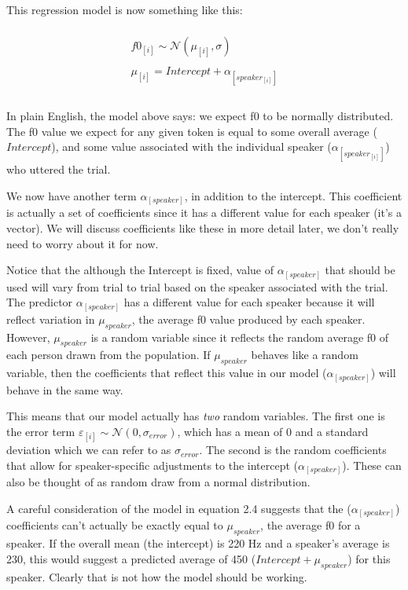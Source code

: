 \documentclass[
]{book}
\begin{document}
This regression model is now something like this:

\begin{equation}
\begin{split}
\\
f0_{[i]} \sim \mathcal{N}(\mu_{[i]},\sigma) \\ \\
\mu_{[i]} = Intercept + \alpha_{[speaker_{[i]}]} \\
\\
\end{split}
\label{eq:26}
\end{equation}

In plain English, the model above says: we expect f0 to be normally distributed. The f0 value we expect for any given token is equal to some overall average (\(Intercept\)), and some value associated with the individual speaker (\(\alpha_{[speaker_{[i]}]}\)) who uttered the trial.

We now have another term \(\alpha_{[speaker]}\), in addition to the intercept. This coefficient is actually a set of coefficients since it has a different value for each speaker (it's a vector). We will discuss coefficients like these in more detail later, we don't really need to worry about it for now.

Notice that the although the Intercept is fixed, value of \(\alpha_{[speaker]}\) that should be used will vary from trial to trial based on the speaker associated with the trial. The predictor \(\alpha_{[speaker]}\) has a different value for each speaker because it will reflect variation in \(\mu_{speaker}\), the average f0 value produced by each speaker. However, \(\mu_{speaker}\) is a random variable since it reflects the random average f0 of each person drawn from the population. If \(\mu_{speaker}\) behaves like a random variable, then the coefficients that reflect this value in our model (\(\alpha_{[speaker]}\)) will behave in the same way.

This means that our model actually has \emph{two} random variables. The first one is the error term \(\varepsilon_{[i]} \sim \mathcal{N}(0,\sigma_{error})\), which has a mean of 0 and a standard deviation which we can refer to as \(\sigma_{error}\). The second is the random coefficients that allow for speaker-specific adjustments to the intercept (\(\alpha_{[speaker]}\)). These can also be thought of as random draw from a normal distribution.

A careful consideration of the model in equation 2.4 suggests that the (\(\alpha_{[speaker]}\)) coefficients can't actually be exactly equal to \(\mu_{speaker}\), the average f0 for a speaker. If the overall mean (the intercept) is 220 Hz and a speaker's average is 230, this would suggest a predicted average of 450 (\(Intercept + \mu_{speaker}\)) for this speaker. Clearly that is not how the model should be working.
\end{document}
